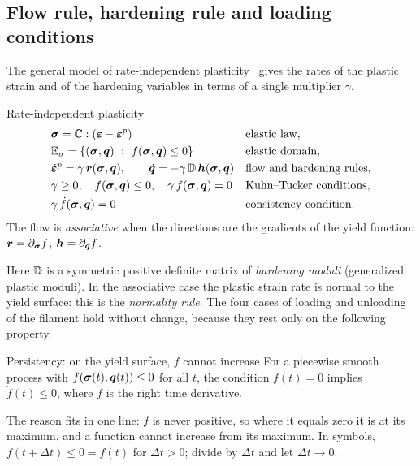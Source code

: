 \subsection{Flow rule, hardening rule and loading conditions}\label{ssec:pl-flow}
%
The general model of rate-independent plasticity~\cite[Sec.~2.2]{SimoHughes1998}
gives the rates of the plastic strain and of the hardening variables in terms
of a single multiplier $\gamma$.
\begin{gbox}{Rate-independent plasticity}
\begin{align}
  &\bm{\sigma}=\mathbb{C}:(\bm{\varepsilon}-\bm{\varepsilon}^{p}) && \text{elastic law},\label{eq:pl-box-el}\\
  &\mathbb{E}_{\sigma}=\{(\bm{\sigma},\bm{q})\ :\ f(\bm{\sigma},\bm{q})\le0\} && \text{elastic domain},\label{eq:pl-box-dom}\\
  &\dot{\bm{\varepsilon}}^p=\gamma\,\bm{r}(\bm{\sigma},\bm{q}),\qquad \dot{\bm{q}}=-\gamma\,\mathbb{D}\,\bm{h}(\bm{\sigma},\bm{q})
  && \text{flow and hardening rules},\label{eq:pl-box-flow}\\
  &\gamma\ge0,\quad f(\bm{\sigma},\bm{q})\le0,\quad\gamma\,f(\bm{\sigma},\bm{q})=0 && \text{Kuhn--Tucker conditions},\label{eq:pl-box-kt}\\
  &\gamma\,\dot f(\bm{\sigma},\bm{q})=0 && \text{consistency condition}.\label{eq:pl-box-cons}
\end{align}
The flow is \emph{associative} when the directions are the gradients of the
yield function: $\bm{r}=\partial_{\bm{\sigma}}f$, $\bm{h}=\partial_{\bm{q}}f$.
\end{gbox}
\noindent Here $\mathbb{D}$ is a symmetric positive definite matrix of
\emph{hardening moduli} (generalized plastic moduli). In the associative case
the plastic strain rate is normal to the yield surface: this is the
\emph{normality rule}. The four cases of loading and unloading of the
filament hold without change, because they rest only on the following
property.

\begin{gbox}{Persistency: on the yield surface, $f$ cannot increase}\label{lem:pl-persist}
For a piecewise smooth process with $f(\bm{\sigma}(t),\bm{q}(t))\le0$ for all $t$, the
condition $f(t)=0$ implies $\dot f(t)\le0$, where $\dot f$ is the right time
derivative.
\end{gbox}
\noindent The reason fits in one line: $f$ is never positive, so where it
equals zero it is at its maximum, and a function cannot increase from its
maximum. In symbols, $f(t+\Delta t)\le0=f(t)$ for $\Delta t>0$; divide by
$\Delta t$ and let $\Delta t\to0$.

